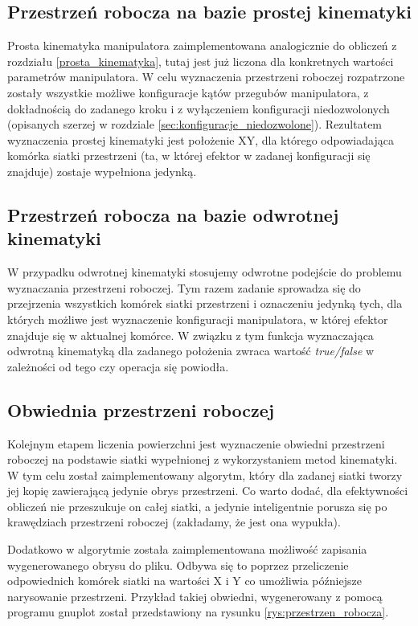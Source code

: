 \documentclass[printmode]{mgr}
\begin{document}
\subsection{Przestrzeń robocza na bazie prostej kinematyki}
Prosta kinematyka manipulatora zaimplementowana analogicznie do obliczeń z rozdziału \ref{prosta_kinematyka},
tutaj jest już liczona dla konkretnych wartości parametrów manipulatora. 
W celu wyznaczenia przestrzeni roboczej rozpatrzone zostały wszystkie możliwe konfiguracje
kątów przegubów manipulatora, z dokładnością do zadanego kroku i z wyłączeniem konfiguracji
niedozwolonych (opisanych szerzej w rozdziale \ref{sec:konfiguracje_niedozwolone}).
Rezultatem wyznaczenia prostej kinematyki jest położenie XY, dla którego odpowiadająca komórka
siatki przestrzeni (ta, w której efektor w zadanej konfiguracji się znajduje)
zostaje wypełniona jedynką. 

\subsection{Przestrzeń robocza na bazie odwrotnej kinematyki}
W przypadku odwrotnej kinematyki stosujemy odwrotne podejście do problemu wyznaczania przestrzeni roboczej. 
Tym razem zadanie sprowadza się do przejrzenia wszystkich komórek siatki przestrzeni i oznaczeniu
jedynką tych, dla których możliwe jest wyznaczenie konfiguracji manipulatora, w której efektor
znajduje się w aktualnej komórce. W związku z tym funkcja wyznaczająca odwrotną kinematyką
dla zadanego położenia zwraca wartość \emph{true/false} w zależności od tego czy operacja
się powiodła. 

\subsection{Obwiednia przestrzeni roboczej}
Kolejnym etapem liczenia powierzchni jest wyznaczenie obwiedni przestrzeni roboczej na podstawie
siatki wypełnionej z wykorzystaniem metod kinematyki. W tym celu został zaimplementowany algorytm, 
który dla zadanej siatki tworzy jej kopię zawierającą jedynie obrys przestrzeni. Co warto dodać,
dla efektywności obliczeń nie przeszukuje on całej siatki, a jedynie inteligentnie porusza się
po krawędziach przestrzeni roboczej (zakładamy, że jest ona wypukła). 

Dodatkowo w algorytmie została zaimplementowana możliwość zapisania wygenerowanego obrysu do pliku. 
Odbywa się to poprzez przeliczenie odpowiednich komórek siatki na wartości X i Y co umożliwia
późniejsze narysowanie przestrzeni. Przykład takiej obwiedni, wygenerowany z pomocą programu gnuplot
został przedstawiony na rysunku \ref{rys:przestrzen_robocza}. 
\end{document}
